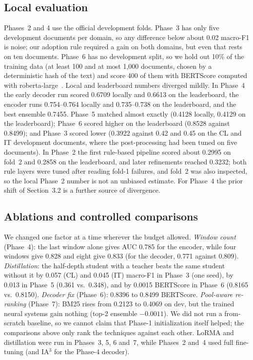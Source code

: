 \documentclass[10pt,a4paper]{article}
\begin{document}
\subsection{Local evaluation}
Phases~2 and 4 use the official development folds. Phase~3 has only five development documents per domain, so any difference below about 0.02 macro-F1 is noise; our adoption rule required a gain on both domains, but even that rests on ten documents. Phase~6 has no development split, so we hold out 10\% of the training data (at least 100 and at most 1{,}000 documents, chosen by a deterministic hash of the text) and score 400 of them with BERTScore computed with roberta-large~\cite{roberta}. Local and leaderboard numbers diverged mildly. In Phase~4 the early decoder run scored 0.6709 locally and 0.6613 on the leaderboard, the encoder runs 0.754--0.764 locally and 0.735--0.738 on the leaderboard, and the best ensemble 0.7455. Phase~5 matched almost exactly (0.4128 locally, 0.4129 on the leaderboard); Phase~6 scored higher on the leaderboard (0.8528 against 0.8499); and Phase~3 scored lower (0.3922 against 0.42 and 0.45 on the CL and IT development documents, where the post-processing had been tuned on five documents). In Phase~2 the first rule-based pipeline scored about 0.2995 on fold~2 and 0.2858 on the leaderboard, and later refinements reached 0.3232; both rule layers were tuned after reading fold-1 failures, and fold~2 was also inspected, so the local Phase~2 number is not an unbiased estimate. For Phase~4 the prior shift of Section~3.2 is a further source of divergence.

\subsection{Ablations and controlled comparisons}
We changed one factor at a time wherever the budget allowed. \emph{Window count} (Phase~4): the last window alone gives AUC 0.785 for the encoder, while four windows give 0.828 and eight give 0.833 (for the decoder, 0.771 against 0.809). \emph{Distillation}: the half-depth student with a teacher beats the same student without it by 0.057 (CL) and 0.045 (IT) macro-F1 in Phase~3 (one seed), by 0.013 in Phase~5 (0.361 vs.\ 0.348), and by 0.0015 BERTScore in Phase~6 (0.8165 vs.\ 0.8150). \emph{Decoder fix} (Phase~6): 0.8396 to 0.8499 BERTScore. \emph{Pool-aware re-ranking} (Phase~7): BM25 rises from 0.2123 to 0.4069 on dev, but the trained neural systems gain nothing (top-2 ensemble $-0.0011$). We did not run a from-scratch baseline, so we cannot claim that Phase-1 initialization itself helped; the comparisons above only rank the techniques against each other. LoRMA and distillation were run in Phases~3, 5, 6 and~7, while Phases~2 and~4 used full fine-tuning (and IA$^3$ for the Phase-4 decoder).
\end{document}
